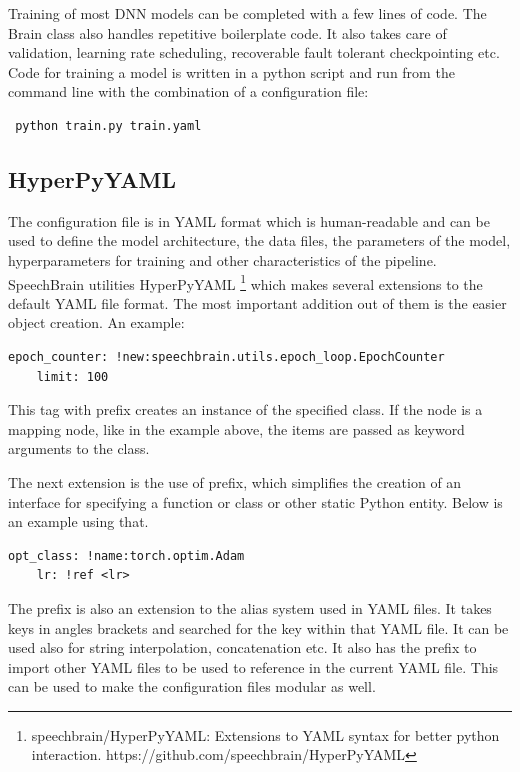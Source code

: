 Training of most DNN models can be completed with a few lines of code. The Brain class also handles repetitive boilerplate code. It also takes care of validation, learning rate scheduling, recoverable fault tolerant checkpointing etc. Code for training a model is written in a python script and run from the command line with the combination of a configuration file: 
\begin{verbatim} python train.py train.yaml\end{verbatim}

\subsection{HyperPyYAML}
The configuration file is in YAML format which is human-readable and can be used to define the model architecture, the data files, the parameters of the model, hyperparameters for training and other characteristics of the pipeline. SpeechBrain utilities HyperPyYAML \footnote{speechbrain/HyperPyYAML:  Extensions  to  YAML  syntax  for  better python interaction. https://github.com/speechbrain/HyperPyYAML} which makes several extensions to the default YAML file format. The most important addition out of them is the easier object creation. An example:

\begin{verbatim}
epoch_counter: !new:speechbrain.utils.epoch_loop.EpochCounter
    limit: 100
\end{verbatim}

This tag with prefix  creates an instance of the specified class. If the node is a mapping node, like in the example above, the items are passed as keyword arguments to the class.

The next extension is the use of prefix,  which simplifies the creation of an interface for specifying a function or class or other static Python entity. Below is an example using that.
\begin{verbatim}
opt_class: !name:torch.optim.Adam
    lr: !ref <lr>
\end{verbatim}
The prefix  is also an extension to the alias system used in YAML files. It takes keys in angles brackets and searched for the key within that YAML file. It can be used also for string interpolation, concatenation etc. It also has the  prefix to import other YAML files to be used to reference in the current YAML file. This can be used to make the configuration files modular as well. 

